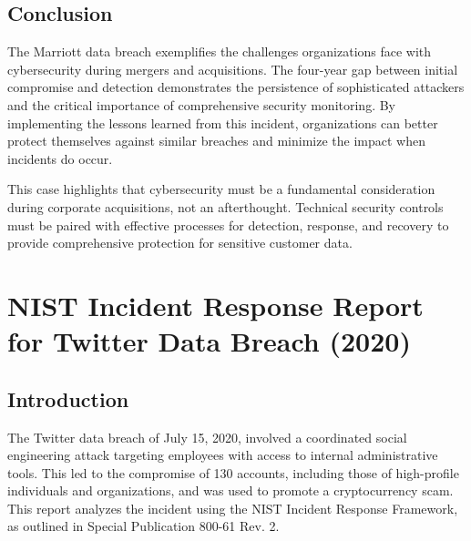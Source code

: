 \documentclass[11pt]{book}
\begin{document}
\section{Conclusion}
The Marriott data breach exemplifies the challenges organizations face with cybersecurity during mergers and acquisitions. The four-year gap between initial compromise and detection demonstrates the persistence of sophisticated attackers and the critical importance of comprehensive security monitoring. By implementing the lessons learned from this incident, organizations can better protect themselves against similar breaches and minimize the impact when incidents do occur.

This case highlights that cybersecurity must be a fundamental consideration during corporate acquisitions, not an afterthought. Technical security controls must be paired with effective processes for detection, response, and recovery to provide comprehensive protection for sensitive customer data.

\chapter{NIST Incident Response Report for Twitter Data Breach (2020)}

\section{Introduction}
The Twitter data breach of July 15, 2020, involved a coordinated social engineering attack targeting employees with access to internal administrative tools. This led to the compromise of 130 accounts, including those of high-profile individuals and organizations, and was used to promote a cryptocurrency scam. This report analyzes the incident using the NIST Incident Response Framework, as outlined in Special Publication 800-61 Rev. 2.
\end{document}

